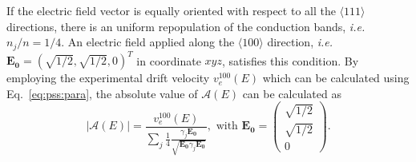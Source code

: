 If the electric field vector is equally oriented with respect to all the $\langle 111 \rangle$ directions, there is an uniform repopulation of the conduction bands, \textit{i.e.} $n_{j}/n = 1/4$. An electric field applied along the $\langle100\rangle$ direction, \textit{i.e.} $\mathbf{E_{0}} = (\sqrt{1/2}, \sqrt{1/2}, 0)^{T}$ in coordinate $xyz$, satisfies this condition. By employing the experimental drift velocity $v_{e}^{100}(E)$ which can be calculated using Eq.~\ref{eq:pss:para}, the absolute value of $\mathcal{A}(E)$ can be calculated as
\begin{equation}
\label{eq:pss:ae}
|\mathcal{A}(E)| = \frac{v_{e}^{100}(E)}  {\displaystyle \sum_{j}     \frac{1}{4} \frac{\gamma_{j}\mathbf{E_{0}}}         {\sqrt{\mathbf{E_{0}}\gamma_{j}\mathbf{E_{0}}}} }, \mbox{ with }       \mathbf{E_{0}} = \left( \begin{array}{c} 
\sqrt{1/2}\\\sqrt{1/2}\\0 \end{array} \right).
\end{equation}

